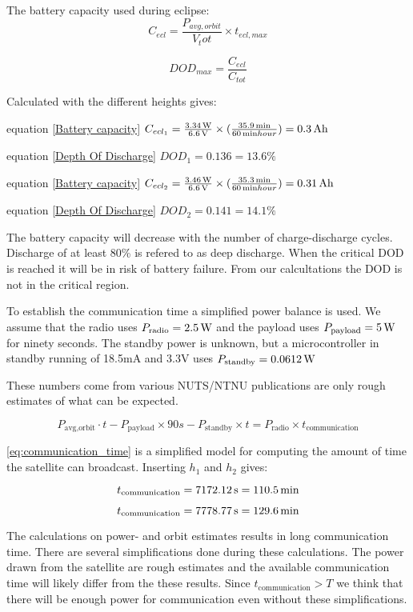 The battery capacity used during eclipse: 
\begin{equation}
C_{ecl} = \frac{P_{avg,orbit}}{V_tot}\times t_{ecl,max}
\label{Battery capacity}
\end{equation}

 \begin{equation}
DOD_{max} = \frac{C_{ecl}}{C_{tot}}
\label{Depth Of Discharge}
\end{equation}

Calculated with the different heights gives:

equation \ref{Battery capacity}
$C_{ecl_1} = \frac{\unit[3.34]{W}}{\unit[6.6]{V}}\times(\frac{\unit[35.9]{min}}{\unit[60]{min}{hour}}) = \unit[0.3]{Ah}$

equation \ref{Depth Of Discharge}
$DOD_1 = 0.136 = 13.6 \%$

equation \ref{Battery capacity}
$C_{ecl_2} = \frac{\unit[3.46]{W}}{\unit[6.6]{V}}\times(\frac{\unit[35.3]{min}}{\unit[60]{min}{hour}}) = \unit[0.31]{Ah}$

equation \ref{Depth Of Discharge}
$DOD_2 = 0.141 = 14.1\%$

The battery capacity will decrease with the number of charge-discharge cycles. Discharge of at least 80\% is refered to as deep discharge. When the critical DOD is reached it will be in risk of battery failure. From our calcultations the DOD is not in the critical region. 

To establish the communication time a simplified power balance is used. We assume that the radio uses $P_{\text{radio}} = \unit[2.5]{W}$ and the payload uses $P_{\text{payload}} = \unit[5]{W}$  for ninety seconds. The standby power is unknown, but a microcontroller in standby running of 18.5mA and 3.3V uses $P_{\text{standby}} = \unit[0.0612]{W}$ 

These numbers come from various NUTS/NTNU publications are only rough estimates of what can be expected.

\begin{equation}
P_{\text{avg,orbit}}\cdot t - P_{\text{payload}}\times 90 s - P_{\text{standby}}\times t= P_{\text{radio}}\times t_{\text{communication}}
\label{eq:communication_time}
\end{equation}

\autoref{eq:communication_time} is a simplified model for computing the amount of time the satellite can broadcast. Inserting $h_1$ and $h_2$ gives:

\begin{equation}
t_{\text{communication}} = \unit[7172.12]{s} =\unit[110.5]{min}
\end{equation}

\begin{equation}
t_{\text{communication}} = \unit[7778.77]{s} =\unit[129.6]{min}
\end{equation}

The calculations on power- and orbit estimates results in long communication time. There are several simplifications done during these calculations. The power drawn from the satellite are rough estimates and the available communication time will likely differ from the these results. Since $t_{\text{communication}}>T$ we think that there will be enough power for communication even without these simplifications.
